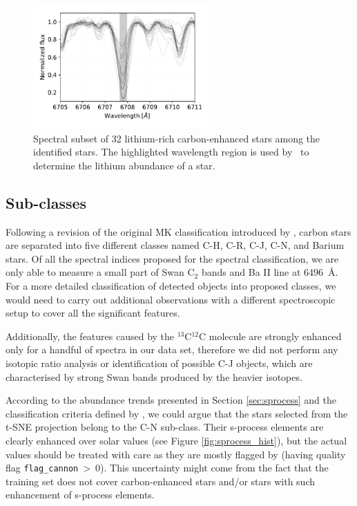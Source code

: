 \begin{figure}
	\centering
	\includegraphics[width=0.6\textwidth]{li_string_ch.pdf}
	\caption{Spectral subset of 32 lithium-rich carbon-enhanced stars among the identified stars. The highlighted wavelength region is used by \TC\ to determine the lithium abundance of a star.}
	\label{fig:li_abund}
\end{figure}

\subsection{Sub-classes}
\label{sec:subclasses}
Following a revision of the original MK classification \cite{1941ApJ....94..501K} introduced by \citet{1996ApJS..105..419B}, carbon stars are separated into five different classes named \mbox{C-H}, \mbox{C-R}, \mbox{C-J}, \mbox{C-N}, and Barium stars. Of all the spectral indices proposed for the spectral classification, we are only able to measure a small part of Swan C$_2$ bands and Ba II line at 6496~\AA. For a more detailed classification of detected objects into proposed classes, we would need to carry out additional observations with a different spectroscopic setup to cover all the significant features. 

Additionally, the features caused by the $^{13}$C$^{12}$C molecule are strongly enhanced only for a handful of spectra in our data set, therefore we did not perform any isotopic ratio analysis or identification of possible C-J objects, which are characterised by strong Swan bands produced by the heavier isotopes.

According to the abundance trends presented in Section \ref{sec:sprocess} and the classification criteria defined by \citet{1996ApJS..105..419B}, we could argue that the stars selected from the t-SNE projection belong to the C-N sub-class. Their s-process elements are clearly enhanced over solar values (see Figure \ref{fig:sprocess_hist}), but the actual values should be treated with care as they are mostly flagged by \TC (having quality flag \texttt{flag\_cannon}~>~0). This uncertainty might come from the fact that the training set does not cover carbon-enhanced stars and/or stars with such enhancement of s-process elements.

